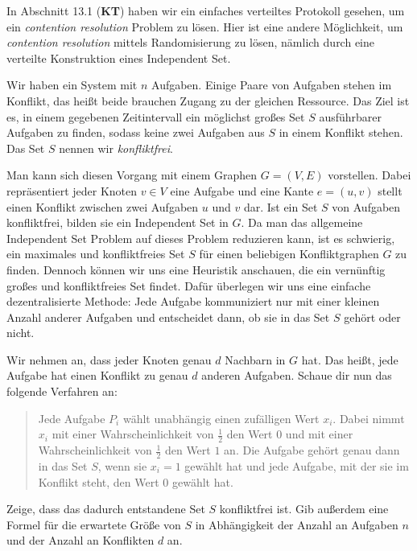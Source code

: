 \documentclass{uebung_cs}
\begin{document}
\begin{aufgabe}
	In Abschnitt 13.1 (\textbf{KT}) haben wir ein einfaches verteiltes Protokoll gesehen, um ein \textit{contention resolution} Problem zu lösen. Hier ist eine andere Möglichkeit, um \textit{contention resolution} mittels Randomisierung zu lösen, nämlich durch eine verteilte Konstruktion eines Independent Set.
	
	Wir haben ein System mit $n$ Aufgaben. Einige Paare von Aufgaben stehen im Konflikt, das heißt beide brauchen Zugang zu der gleichen Ressource. Das Ziel ist es, in einem gegebenen Zeitintervall ein möglichst großes Set $S$ ausführbarer Aufgaben zu finden, sodass keine zwei Aufgaben aus $S$ in einem Konflikt stehen. Das Set $S$ nennen wir \textit{konfliktfrei}.
	
	Man kann sich diesen Vorgang mit einem Graphen $G = (V,E)$ vorstellen. Dabei repräsentiert jeder Knoten $v \in V$ eine Aufgabe und eine Kante $e = (u,v)$ stellt einen Konflikt zwischen zwei Aufgaben $u$ und $v$ dar. Ist ein Set $S$ von Aufgaben konfliktfrei, bilden sie ein Independent Set in $G$. Da man das allgemeine Independent Set Problem auf dieses Problem reduzieren kann, ist es schwierig, ein maximales und konfliktfreies Set $S$ für einen beliebigen Konfliktgraphen $G$ zu finden. Dennoch können wir uns eine Heuristik anschauen, die ein vernünftig großes und konfliktfreies Set findet. Dafür überlegen wir uns eine einfache dezentralisierte Methode: Jede Aufgabe kommuniziert nur mit einer kleinen Anzahl anderer Aufgaben und entscheidet dann, ob sie in das Set $S$ gehört oder nicht.
	
	Wir nehmen an, dass jeder Knoten genau $d$ Nachbarn in $G$ hat. Das heißt, jede Aufgabe hat einen Konflikt zu genau $d$ anderen Aufgaben.
	Schaue dir nun das folgende Verfahren an:
	\begin{quote}
		Jede Aufgabe $P_i$ wählt unabhängig einen zufälligen Wert $x_i$. Dabei nimmt $x_i$ mit einer Wahrscheinlichkeit von $\frac{1}{2}$ den Wert $0$ und mit einer Wahrscheinlichkeit von $\frac{1}{2}$ den Wert $1$ an. Die Aufgabe gehört genau dann in das Set $S$, wenn sie $x_i = 1$ gewählt hat und jede Aufgabe, mit der sie im Konflikt steht, den Wert $0$ gewählt hat.
	\end{quote}
	Zeige, dass das dadurch entstandene Set $S$ konfliktfrei ist. Gib außerdem eine Formel für die erwartete Größe von $S$ in Abhängigkeit  der Anzahl an Aufgaben $n$ und der Anzahl an Konflikten $d$ an.
\end{aufgabe}
\end{document}
